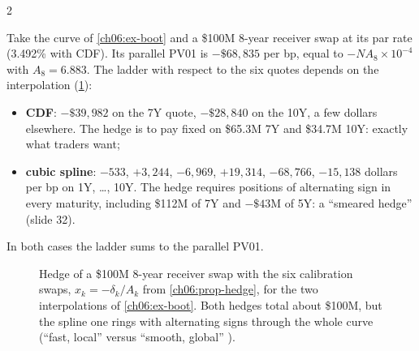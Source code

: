 \begin{paracol}{2}
\begin{example}
Take the curve of \cref{ch06:ex-boot} and a \$100M 8-year receiver swap at its par rate (3.492\% with CDF). Its
parallel PV01 is $-\$68{,}835$ per bp, equal to $-NA_8\times10^{-4}$ with $A_8=6.883$. The ladder with respect to
the six quotes depends on the interpolation (\cref{ch06:fig-ladder}):
\begin{itemize}
  \item \textbf{CDF}: $-\$39{,}982$ on the 7Y quote, $-\$28{,}840$ on the 10Y, a few dollars elsewhere. The hedge is
        to pay fixed on \$65.3M 7Y and \$34.7M 10Y: exactly what traders want;
  \item \textbf{cubic spline}: $-533$, $+3{,}244$, $-6{,}969$, $+19{,}314$, $-68{,}766$, $-15{,}138$ dollars per bp
        on 1Y, \dots, 10Y. The hedge requires positions of alternating sign in every maturity, including
        \$112M of 7Y and $-\$43$M of 5Y: a ``smeared hedge'' (slide 32).
\end{itemize}
In both cases the ladder sums to the parallel PV01.
\end{example}

\begin{figure}[ht]
\centering
{}
\caption{Hedge of a \$100M 8-year receiver swap with the six calibration swaps, $x_k=-\delta_k/A_k$ from
\cref{ch06:prop-hedge}, for the two interpolations of \cref{ch06:ex-boot}. Both hedges total about \$100M, but
the spline one rings with alternating signs through the whole curve (``fast, local'' versus ``smooth, global''
).}
\label{ch06:fig-ladder}
\end{figure}


\end{paracol}
